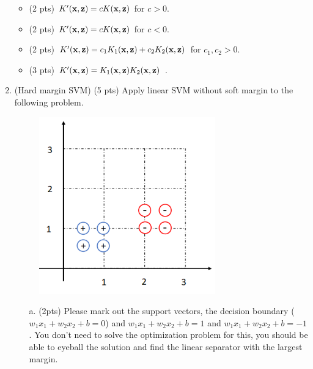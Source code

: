 \documentclass{article}
\def\z{{\bf z}}
\def\x{{\bf x}}
\begin{document}
\begin{enumerate}
\begin{itemize}
\item (2 pts) $K'(\x, \z) = cK(\x, \z)$ for $c > 0$.\\
\item (2 pts) $K'(\x,\z) = cK(\x, \z)$ for $c < 0$.\\
\item (2 pts) $K'(\x,\z)= c_1K_1(\x, \z)+c_2K_2(\x,\z)$ for $c_1, c_2 >0$.\\
\item (3 pts) $K'(\x,\z)= K_1(\x, \z)K_2(\x,\z)$ .\\

\end{itemize}
\item (Hard margin SVM) (5 pts) Apply linear SVM without soft margin to the 
following problem.
\begin{center}
\begin{figure}[h]
\includegraphics[width=3in]{svm.pdf}
\end{figure}
\end{center}

\begin{itemize} \item[a.] (2pts) Please mark out the support vectors, the 
decision boundary ($w_1x_1+w_2x_2 +b =0$) and $w_1x_1+w_2x_2+b =1$ and 
$w_1x_1+w_2x_2+b =-1$. You don't need to solve the optimization problem for 
this, you should be able to eyeball the solution and find the linear separator 
with the largest margin.


\end{itemize}
\end{enumerate}
\end{document}

